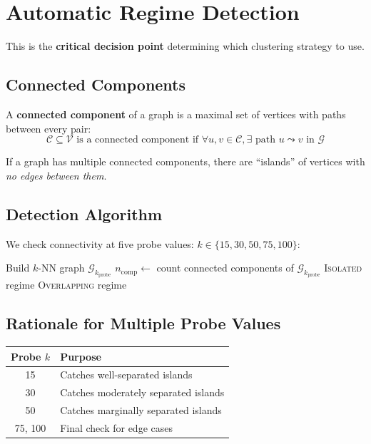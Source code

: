 \documentclass[11pt,a4paper]{article}
\newcommand{\set}[1]{\mathcal{#1}}
\begin{document}
\section{Automatic Regime Detection}

This is the \textbf{critical decision point} determining which clustering strategy to use.

\subsection{Connected Components}

A \textbf{connected component} of a graph is a maximal set of vertices with paths between every pair:
\begin{equation}
    \set{C} \subseteq \set{V} \text{ is a connected component if } \forall u, v \in \set{C}, \exists \text{ path } u \leadsto v \text{ in } \set{G}
\end{equation}

If a graph has multiple connected components, there are ``islands'' of vertices with \textit{no edges between them}.

\subsection{Detection Algorithm}

We check connectivity at five probe values: $k \in \{15, 30, 50, 75, 100\}$:

\begin{algorithm}[H]
\caption{Regime Detection}
\begin{algorithmic}[1]
    \State Build $k$-NN graph $\set{G}_{k_{\text{probe}}}$
    \State $n_{\text{comp}} \gets$ count connected components of $\set{G}_{k_{\text{probe}}}$
        \State \Return \textsc{Isolated} regime
    \EndIf
\EndFor
\State \Return \textsc{Overlapping} regime
\end{algorithmic}
\end{algorithm}

\subsection{Rationale for Multiple Probe Values}

\begin{table}[h]
\centering
\begin{tabular}{@{}cl@{}}
\toprule
\textbf{Probe $k$} & \textbf{Purpose} \\
\midrule
15 & Catches well-separated islands \\
30 & Catches moderately separated islands \\
50 & Catches marginally separated islands \\
75, 100 & Final check for edge cases \\
\bottomrule
\end{tabular}
\end{table}
\end{document}
